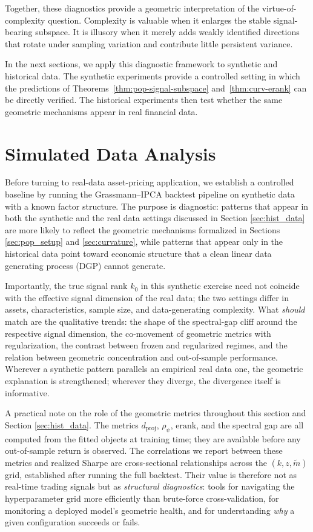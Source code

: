 \documentclass[11pt,letterpaper]{article}
\newcommand{\rhopsi}{\rho_{\psi}}
\newcommand{\dproj}{d_{\mathrm{proj}}}
\newcommand{\erank}{\mathrm{erank}}
\begin{document}
Together, these diagnostics provide a geometric interpretation of the virtue-of-complexity question. Complexity is valuable when it enlarges the stable signal-bearing subspace. It is illusory when it merely adds weakly identified directions that rotate under sampling variation and contribute little persistent variance.

In the next sections, we apply this diagnostic framework to synthetic and historical data. The synthetic experiments provide a controlled setting in which the predictions of Theorems~\ref{thm:pop-signal-subspace} and~\ref{thm:curv-erank} can be directly verified. The historical experiments then test whether the same geometric mechanisms appear in real financial data.

\section{Simulated Data Analysis}
\label{sec:simulated}

Before turning to real-data asset-pricing application, we establish a controlled baseline by running the Grassmann--IPCA backtest pipeline on synthetic data with a known factor structure. The purpose is diagnostic: patterns that appear in both the synthetic and the real data settings discussed in Section \ref{sec:hist_data} are more likely to reflect the geometric mechanisms formalized in Sections \ref{sec:pop_setup} and \ref{sec:curvature}, while patterns that appear only in the historical data point toward economic structure that a clean linear data generating process (DGP) cannot generate.

Importantly, the true signal rank $k_0$ in this synthetic exercise need not coincide with the effective signal dimension of the real data; the two settings differ in assets, characteristics, sample size, and data-generating complexity. What \emph{should} match are the qualitative trends: the shape of the spectral-gap cliff around the respective signal dimension, the co-movement of geometric metrics with regularization, the contrast between frozen and regularized regimes, and the relation between geometric concentration and out-of-sample performance. Wherever a synthetic pattern parallels an empirical real data one, the geometric explanation is strengthened; wherever they diverge, the divergence itself is informative.

A practical note on the role of the geometric metrics throughout this section and Section \ref{sec:hist_data}. The metrics $\dproj$, $\rhopsi$, $\erank$, and the spectral gap are all computed from the fitted objects at training time; they are available before any out-of-sample return is observed. The correlations we report between these metrics and realized Sharpe are cross-sectional relationships across the $(k, z, \tilde m)$ grid, established after running the full backtest. Their value is therefore not as real-time trading signals but as \emph{structural diagnostics}: tools for navigating the hyperparameter grid more efficiently than brute-force cross-validation, for monitoring a deployed model's geometric health, and for understanding \emph{why} a given configuration succeeds or fails.
\end{document}
